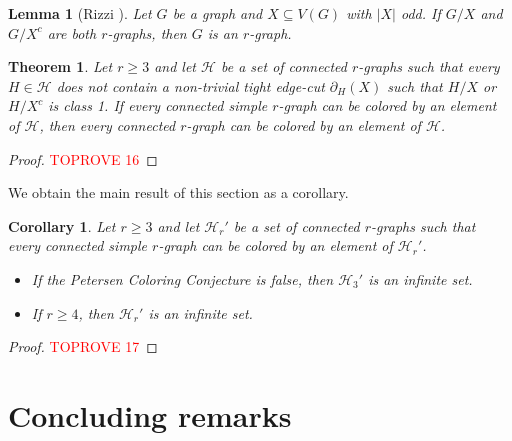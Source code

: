 \documentclass[a4paper,11pt]{article}
\newcommand{\ca}{\mathcal}
\newtheorem{theo}[defi]{Theorem}
\newtheorem{lem}[defi]{Lemma}
\newtheorem{cor}[defi]{Corollary}
\theoremstyle{remark}
\begin{document}
\begin{lem}[Rizzi \cite{rizzi1999indecomposable}]\label{Lemma-keep-r-graph}
	Let $ G $ be a graph and $ X\subseteq V(G) $ with $ |X| $ odd. If $G/X$ and $G/X^c$ are both $ r $-graphs, then $ G $ is an $r$-graph.
\end{lem}

 


\begin{theo}\label{theo:reduction_simple_case}
	Let $r\geq 3$ and let $\ca H$ be a set of connected $r$-graphs such that every  $H\in \ca H$ does not contain a  non-trivial tight edge-cut $\partial_H(X)$ such that  $H/X$ or $H/X^c$ is class 1.
	If 
	every connected simple $r$-graph can be colored by an element of $\ca H$, 
then every connected $r$-graph can be colored by an element of $\ca H$.
\end{theo}

\begin{proof}\textcolor{red}{TOPROVE 16}\end{proof}




We obtain the main result of this section as a corollary.

\begin{cor}\label{cor:color-simple-r-graphs}
	Let $ r\geq3 $ and let $\ca H_r'$ be a set of connected $r$-graphs such that every connected simple $r$-graph can be colored by an element of $\ca H_r'$.
\begin{itemize}
\item[$i)$] If the Petersen Coloring Conjecture is false, then $\ca H_3'$ is an infinite set.
\item[$ii)$] If $r \geq 4$, then $\ca H_r'$ is an infinite set. 
\end{itemize}	
	 
\end{cor}



\begin{proof}\textcolor{red}{TOPROVE 17}\end{proof}



\section{Concluding remarks} \label{Sec: final remarks}
\end{document}
